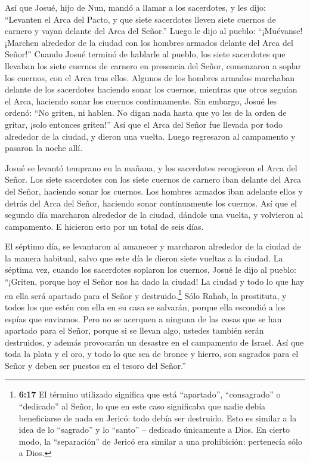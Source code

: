  Así que Josué, hijo de Nun, mandó a llamar a los
sacerdotes, y les dijo: ``Levanten el Arca del Pacto, y que siete
sacerdotes lleven siete cuernos de carnero y vayan delante del Arca del
Señor.''  Luego le dijo al pueblo: ``¡Muévanse! ¡Marchen
alrededor de la ciudad con los hombres armados delante del Arca del
Señor!''  Cuando Josué terminó de hablarle al pueblo, los
siete sacerdotes que llevaban los siete cuernos de carnero en presencia
del Señor, comenzaron a soplar los cuernos, con el Arca tras ellos.
 Algunos de los hombres armados marchaban delante de los
sacerdotes haciendo sonar los cuernos, mientras que otros seguían el
Arca, haciendo sonar los cuernos continuamente.  Sin
embargo, Josué les ordenó: ``No griten, ni hablen. No digan nada hasta
que yo les de la orden de gritar, ¡solo entonces griten!'' 
Así que el Arca del Señor fue llevada por todo alrededor de la ciudad, y
dieron una vuelta. Luego regresaron al campamento y pasaron la noche
allí.

 Josué se levantó temprano en la mañana, y los sacerdotes
recogieron el Arca del Señor.  Los siete sacerdotes con los
siete cuernos de carnero iban delante del Arca del Señor, haciendo sonar
los cuernos. Los hombres armados iban adelante ellos y detrás del Arca
del Señor, haciendo sonar continuamente los cuernos.  Así
que el segundo día marcharon alrededor de la ciudad, dándole una vuelta,
y volvieron al campamento. E hicieron esto por un total de seis días.

 El séptimo día, se levantaron al amanecer y marcharon
alrededor de la ciudad de la manera habitual, salvo que este día le
dieron siete vueltas a la ciudad.  La séptima vez, cuando
los sacerdotes soplaron los cuernos, Josué le dijo al pueblo: ``¡Griten,
porque hoy el Señor nos ha dado la ciudad!  La ciudad y
todo lo que hay en ella será apartado para el Señor y
destruido.\footnote{\textbf{6:17} El término utilizado significa que
  está ``apartado'', ``consagrado'' o ``dedicado'' al Señor, lo que en
  este caso significaba que nadie debía beneficiarse de nada en Jericó:
  todo debía ser destruido. Esto es similar a la idea de lo ``sagrado''
  y lo ``santo'' -- dedicado únicamente a Dios. En cierto modo, la
  ``separación'' de Jericó era similar a una prohibición: pertenecía
  sólo a Dios.} Sólo Rahab, la prostituta, y todos los que estén con
ella en su casa se salvarán, porque ella escondió a los espías que
enviamos.  Pero no se acerquen a ninguna de las cosas que
se han apartado para el Señor, porque si se llevan algo, ustedes también
serán destruidos, y además provocarán un desastre en el campamento de
Israel.  Así que toda la plata y el oro, y todo lo que sea
de bronce y hierro, son sagrados para el Señor y deben ser puestos en el
tesoro del Señor.''

